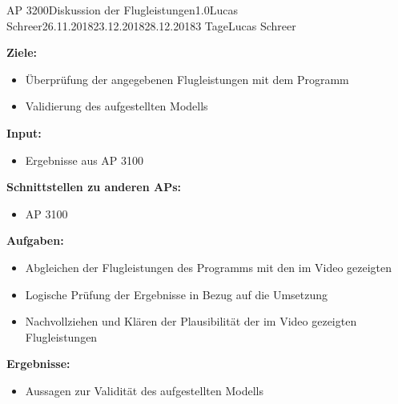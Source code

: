 \clearpage
\begin{wpd}{AP 3200}{Diskussion der Flugleistungen}{1.0}{Lucas Schreer}{26.11.2018}{23.12.2018}{28.12.2018}{3 Tage}{Lucas Schreer}
    {
    \textbf{Ziele:}
    \begin{itemize}
        \item Überprüfung der angegebenen Flugleistungen mit dem Programm
        \item Validierung des aufgestellten Modells
    \end{itemize}
    \textbf{Input:}
    \begin{itemize}
        \item Ergebnisse aus AP 3100
    \end{itemize}
    \textbf{Schnittstellen zu anderen APs:}
    \begin{itemize}
        \item AP 3100
    \end{itemize}
    \textbf{Aufgaben:}
    \begin{itemize}
        \item Abgleichen der Flugleistungen des Programms mit den im Video gezeigten
        \item Logische Prüfung der Ergebnisse in Bezug auf die Umsetzung
        \item Nachvollziehen und Klären der Plausibilität der im Video gezeigten Flugleistungen
    \end{itemize}
    \textbf{Ergebnisse:}
    \begin{itemize}
        \item Aussagen zur Validität des aufgestellten Modells
    \end{itemize}
    }
\end{wpd}


